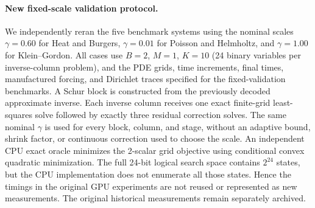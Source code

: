 
\paragraph{New fixed-scale validation protocol.}
We independently reran the five benchmark systems using the nominal scales
$\gamma=0.60$ for Heat and Burgers, $\gamma=0.01$ for Poisson and Helmholtz,
and $\gamma=1.00$ for Klein--Gordon. All cases use $B=2$, $M=1$, $K=10$
(24 binary variables per inverse-column problem), and the PDE grids,
time increments, final times, manufactured forcing, and Dirichlet traces
specified for the fixed-validation benchmarks. A Schur block is constructed
from the previously decoded approximate inverse. Each inverse column receives
one exact finite-grid least-squares solve followed by exactly three residual
correction solves. The same nominal $\gamma$ is used for every block, column,
and stage, without an adaptive bound, shrink factor, or continuous correction
used to choose the scale. An independent CPU exact oracle minimizes the
2-scalar grid objective using conditional convex quadratic minimization.
The full 24-bit logical search space contains $2^{24}$ states, but the CPU
implementation does not enumerate all those states. Hence the timings in the
original GPU experiments are not reused or represented as new measurements.
The original historical measurements remain separately archived.

